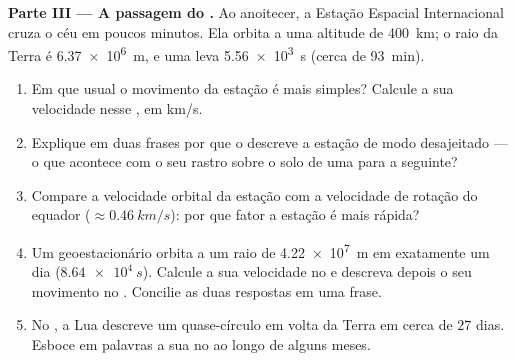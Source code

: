 \begin{problem}
\medskip
\noindent\textbf{Parte III --- A passagem do .}
Ao anoitecer, a Estação Espacial Internacional cruza o céu em poucos
minutos. Ela orbita a uma altitude de \qty{400}{km}; o raio da Terra é
\qty{6.37e6}{m}, e uma  leva \qty{5.56e3}{s} (cerca de
\qty{93}{min}).
\begin{enumerate}[resume]
  \item Em que  usual o movimento da estação é mais simples?
        Calcule a sua velocidade nesse , em \unit{km/s}.
  \item Explique em duas frases por que o  descreve a
        estação de modo desajeitado --- o que acontece com o seu rastro
        sobre o solo de uma  para a seguinte?
  \item Compare a velocidade orbital da estação com a velocidade de
        rotação do equador ($\approx \qty{0.46}{km/s}$): por que fator a
        estação é mais rápida?
  \item Um  geoestacionário orbita a um raio de \qty{4.22e7}{m}
        em exatamente um dia ($\qty{8.64e4}{s}$). Calcule a sua
        velocidade no  e descreva depois o seu
        movimento no . Concilie as duas respostas em
        uma frase.
  \item No , a Lua descreve um quase-círculo em
        volta da Terra em cerca de $27$ dias. Esboce em palavras a sua
         no  ao longo de alguns meses.
\end{enumerate}


\end{problem}

